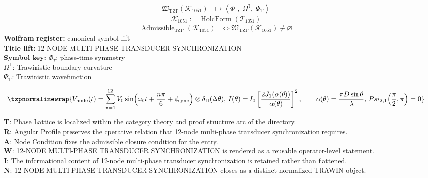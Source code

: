 \noindent
\begin{minipage}[t]{0.48\linewidth}
\begingroup
\small
\[
\begin{aligned}
\mathfrak{W}_{\mathrm{TZP}}\!\left(\mathcal{K}_{1051}\right)
&\longmapsto
\left\langle \Phi_{\tau},\; \Omega^{\mathbb{T}},\; \Psi_{\mathrm{T}} \right\rangle
\end{aligned}
\]
\[
\mathcal{K}_{1051}
:=
\operatorname{HoldForm}\!\left(\mathcal{T}_{1051}\right)
\]
\[
\begin{aligned}
\operatorname{Admissible}_{\mathrm{TZP}}\!\left(\mathcal{K}_{1051}\right)
&\Longleftrightarrow
\mathfrak{W}_{\mathrm{TZP}}\!\left(\mathcal{K}_{1051}\right)\not\equiv\varnothing
\end{aligned}
\]
\textbf{Wolfram register:} canonical symbol lift\\
\textbf{Title lift:} 12-NODE MULTI-PHASE TRANSDUCER SYNCHRONIZATION\\
\textbf{Symbol key:} \(\Phi_{\tau}\): phase-time symmetry\\ \(\Omega^{\mathbb{T}}\): Trawinistic boundary curvature\\ \(\Psi_{\mathrm{T}}\): Trawinistic wavefunction
\par
\endgroup
\end{minipage}\hfill
\begin{minipage}[t]{0.48\linewidth}
\[
\tzpnormalizewrap{V_{\mathrm{node}}(t)=\sum_{n=1}^{12}V_{0}\sin\!\left(\omega_{0}t+\frac{n\pi}{6}+\phi_{\mathrm{sync}}\right)\otimes \delta_{\Pi}(\Delta\theta),\,I(\theta)=I_{0}\left[\frac{2J_{1}(\alpha(\theta))}{\alpha(\theta)}\right]^{2},\qquad \alpha(\theta)=\frac{\pi D\sin\theta}{\lambda},\,Psi_{2,1}\!\left(\frac{\pi}{2},\pi\right)=0}
\]

\small
\textbf{T}: Phase Lattice is localized within the category theory and proof structure arc of the directory.\\
\textbf{R}: Angular Profile preserves the operative relation that 12-node multi-phase transducer synchronization requires.\\
\textbf{A}: Node Condition fixes the admissible closure condition for the entry.\\
\textbf{W}: 12-NODE MULTI-PHASE TRANSDUCER SYNCHRONIZATION is rendered as a reusable operator-level statement.\\
\textbf{I}: The informational content of 12-node multi-phase transducer synchronization is retained rather than flattened.\\
\textbf{N}: 12-NODE MULTI-PHASE TRANSDUCER SYNCHRONIZATION closes as a distinct normalized TRAWIN object.
\normalsize
\end{minipage}

